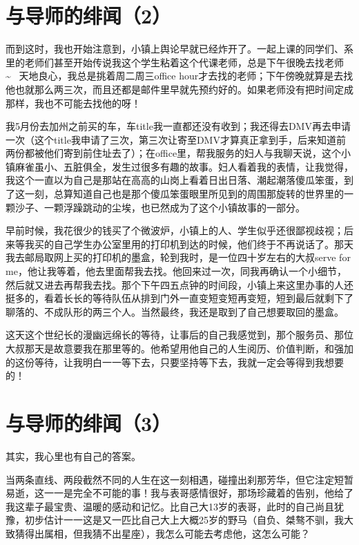 \documentclass[12pt]{book}
\begin{document}
\section{与导师的绯闻（2）}
\label{sec-44-2}

而到这时，我也开始注意到，小镇上舆论早就已经炸开了。一起上课的同学们、系里的老师们甚至开始传说我这个学生粘着这个代课老师，总是下午很晚去找老师\textasciitilde{}~ 天地良心，我总是挑着周二周三office hour才去找的老师；下午傍晚就算是去找他也就那么两三次，而且还都是邮件里早就先预约好的。如果老师没有把时间定成那样，我也不可能去找他的呀！

我5月份去加州之前买的车，车title我一直都还没有收到；我还得去DMV再去申请一次（这个title我申请了三次，第三次让寄至DMV才算真正拿到手，后来知道前两份都被他们寄到前住址去了）；在office里，帮我服务的妇人与我聊天说，这个小镇麻雀虽小、五脏俱全，发生过很多有趣的故事。妇人看着我的表情，让我觉得，我这个一直以为自己是那站在高高的山岗上看着日出日落、潮起潮落傻瓜笨蛋，到了这一刻，总算知道自己也是那个傻瓜笨蛋眼里所见到的周围那旋转的世界里的一颗沙子、一颗浮躁跳动的尘埃，也已然成为了这个小镇故事的一部分。

早前时候，我花很少的钱买了个微波炉，小镇上的人、学生似乎还很鄙视歧视；后来等我买的自己学生办公室里用的打印机到达的时候，他们终于不再说话了。那天我去邮局取网上买的打印机的墨盒，轮到我时，是一位四十岁左右的大叔serve for me，他让我等着，他去里面帮我去找。他回来过一次，同我再确认一个小细节，然后就又进去再帮我去找。那个下午四五点钟的时间段，小镇上来这里办事的人还挺多的，看着长长的等待队伍从排到门外一直变短变短再变短，短到最后就剩下了聊落的、不成队形的两三个人。当然最终，我还是取到了自己想要取回的墨盒。

这天这个世纪长的漫幽远绵长的等待，让事后的自己我感觉到，那个服务员、那位大叔那天是故意要我在那里等的。他希望用他自己的人生阅历、价值判断，和强加的这份等待，让我明白一一等下去，只要坚持等下去，我就一定会等得到我想要的！

\section{与导师的绯闻（3）}
\label{sec-44-3}

其实，我心里也有自己的答案。

当两条直线、两段截然不同的人生在这一刻相遇，碰撞出刹那芳华，但它注定短暂易逝，这一一是完全不可能的事！我与表哥感情很好，那场珍藏着的告别，他给了我这辈子最宝贵、温暖的感动和记忆。比自己大13岁的表哥，此时的自己尚且犹豫，初步估计一一这是又一匹比自己大上大概25岁的野马（自负、桀骜不驯，我大致猜得出属相，但我猜不出星座），我怎么可能去考虑他，这怎么可能？
\end{document}
